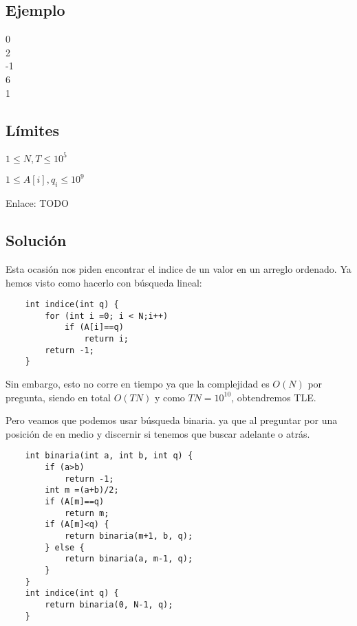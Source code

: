 \subsection*{Ejemplo}
\begin{casebox2}
	{
		0\\
		2\\
		-1\\
		6\\
		1		
	}
\end{casebox2}
\subsection*{Límites}
\begin{plimits}
	\item \(1\leq N,T \leq 10^5 \)
	\item \(1\leq A[i], q_i \leq 10^9 \)
\end{plimits}

Enlace: TODO

\subsection*{Solución}
Esta ocasión nos piden encontrar el indice de un valor en un arreglo ordenado. Ya hemos visto como hacerlo con búsqueda lineal:

\begin{lstlisting}
	int indice(int q) {
		for (int i =0; i < N;i++) 
			if (A[i]==q)
				return i;
		return -1;
	}
\end{lstlisting}

Sin embargo, esto no corre en tiempo ya que la complejidad es \(O(N)\) por pregunta, siendo en total \(O(TN)\) y como \(TN=10^{10}\), obtendremos TLE.

Pero veamos que podemos usar búsqueda binaria. ya que al preguntar por una posición de en medio y discernir si tenemos que buscar adelante o atrás.

\begin{lstlisting}
	int binaria(int a, int b, int q) {
		if (a>b)
			return -1;
		int m =(a+b)/2;
		if (A[m]==q)
			return m;
		if (A[m]<q) {
			return binaria(m+1, b, q);
		} else {
			return binaria(a, m-1, q);
		}		
	}
	int indice(int q) {
		return binaria(0, N-1, q);
	}
\end{lstlisting}

